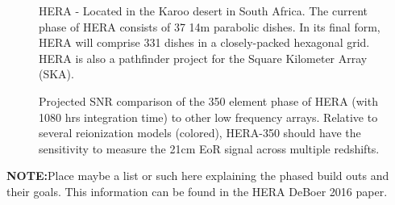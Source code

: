 \documentclass[a0,landscape]{a0poster}
\begin{document}
\begin{multicols}{4}
\begin{figure}[H]
\centering
\label{fig:HERA}
\caption{HERA - Located in the Karoo desert in South Africa. The current phase of HERA consists of 37 14m parabolic dishes. In its final form, HERA will comprise 331 dishes in a closely-packed hexagonal grid. HERA is also a pathfinder project for the Square Kilometer Array (SKA).}
\end{figure}

\begin{figure}[H]
\centering
\label{fig:HERA}
\caption{Projected SNR comparison of the 350 element phase of HERA (with 1080 hrs integration time) to other low frequency arrays. Relative to several reionization models (colored), HERA-350
should have the sensitivity to measure the 21cm EoR signal across multiple redshifts.}
\end{figure}

\textbf{NOTE:}Place maybe a list or such here explaining the phased build outs and their goals. This information can be found in the HERA DeBoer 2016 paper.


\end{multicols}
\end{document}
